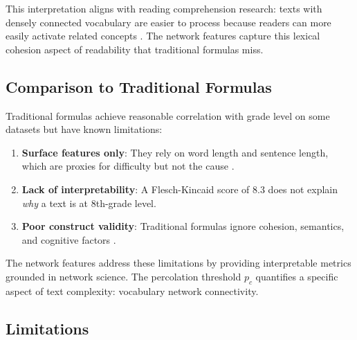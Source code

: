\documentclass[11pt,letterpaper]{article}
\begin{document}
This interpretation aligns with reading comprehension research: texts with densely connected vocabulary are easier to process because readers can more easily activate related concepts \cite{Kintsch1998}. The network features capture this lexical cohesion aspect of readability that traditional formulas miss.

\subsection{Comparison to Traditional Formulas}

Traditional formulas achieve reasonable correlation with grade level on some datasets but have known limitations:

\begin{enumerate}
\item \textbf{Surface features only}: They rely on word length and sentence length, which are proxies for difficulty but not the cause \cite{CollinsThompson2014}.
\item \textbf{Lack of interpretability}: A Flesch-Kincaid score of 8.3 does not explain \textit{why} a text is at 8th-grade level.
\item \textbf{Poor construct validity}: Traditional formulas ignore cohesion, semantics, and cognitive factors \cite{Redish2000}.
\end{enumerate}

The network features address these limitations by providing interpretable metrics grounded in network science. The percolation threshold $p_c$ quantifies a specific aspect of text complexity: vocabulary network connectivity.

\subsection{Limitations}
\end{document}
